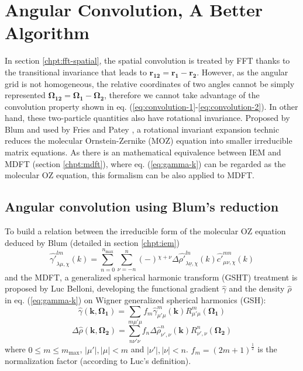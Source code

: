 
\chapter{Angular Convolution, A Better Algorithm\label{chpt:angular-convolution}}

In section \ref{chpt:fft-spatial}, the spatial convolution is treated
by FFT thanks to the transitional invariance that leads to $\mathbf{r_{12}}=\mathbf{r_{1}}-\mathbf{r_{2}}$.
However, as the angular grid is not homogeneous, the relative coordinates
of two angles cannot be simply represented $\mathbf{\Omega_{12}}=\mathbf{\Omega_{1}}-\mathbf{\Omega_{2}}$,
therefore we cannot take advantage of the convolution property shown
in eq. (\ref{eq:convolution-1}-\ref{eq:convolution-2}). In other
hand, these two-particle quantities also have rotational invariance.
Proposed by Blum \citep{Blum_I,Blum_II} and used by Fries and Patey
\citep{Fries_Patey_1985}, a rotational invariant expansion technic
reduces the molecular Ornstein-Zernike (MOZ) equation into smaller
irreducible matrix equations. As there is an mathematical equivalence
between IEM and MDFT (section \ref{chpt:mdft}), where eq. (\ref{eq:gamma-k})
can be regarded as the molecular OZ equation, this formalism can be
also applied to MDFT.


\section{Angular convolution using Blum's reduction}

To build a relation between the irreducible form of the molecular
OZ equation deduced by Blum (detailed in section \ref{chpt:iem})
\begin{equation}
\hat{\gamma'}_{\lambda\mu,\chi}^{lm}(k)=\sum_{n=0}^{n_{\mathrm{max}}}\sum_{\nu=-n}^{n}\left(-\right){}^{\chi+\nu}\Delta\hat{\rho'}_{\lambda\underline{\nu},\chi}^{ln}(k)\hat{c'}_{\mu\nu,\chi}^{mn}(k)\label{eq:Blum-reduced-OZ}
\end{equation}
and the MDFT, a generalized spherical harmonic transform (GSHT) treatment
is proposed by Luc Belloni, developing the functional gradient $\hat{\gamma}$
and the density $\hat{\rho}$ in eq. (\ref{eq:gamma-k}) on Wigner
generalized spherical harmonics (GSH):
\begin{equation}
\hat{\gamma}(\mathbf{k},\mathbf{\Omega_{1}})=\sum_{m\mu'\mu}f_{m}\hat{\gamma}_{\mu'\mu}^{m}(\mathbf{k})R_{\mu'\mu}^{m}(\mathbf{\Omega_{1}})\label{eq:gamma-projection}
\end{equation}
\begin{equation}
\Delta\hat{\rho}(\mathbf{k},\mathbf{\Omega_{2}})=\sum_{n\nu'\nu}f_{n}\Delta\hat{\rho}_{\nu',\nu}^{n}(\mathbf{k})R_{\nu',\nu}^{n}(\mathbf{\Omega_{2}})\label{eq:delta-rho-projection}
\end{equation}
where $0\leq m\leq m_{\mathrm{max}}$, $\left|\mu'\right|,\left|\mu\right|<m$
and $\left|\nu'\right|,\left|\nu\right|<n$. $f_{m}=\left(2m+1\right)^{\frac{1}{2}}$
is the normalization factor (according to Luc's definition).

